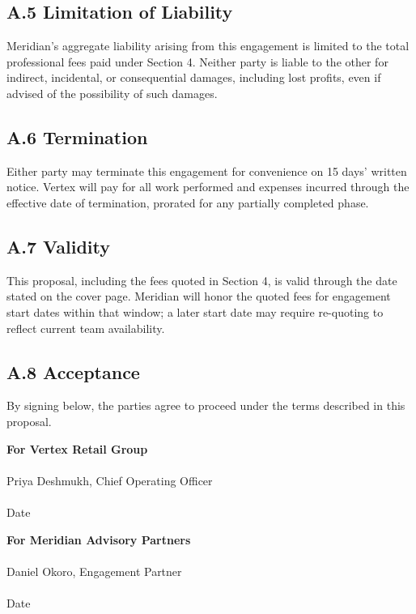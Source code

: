 \subsection*{A.5 Limitation of Liability}
Meridian's aggregate liability arising from this engagement is limited to the
total professional fees paid under Section 4. Neither party is liable to the
other for indirect, incidental, or consequential damages, including lost
profits, even if advised of the possibility of such damages.

\subsection*{A.6 Termination}
Either party may terminate this engagement for convenience on 15 days'
written notice. Vertex will pay for all work performed and expenses incurred
through the effective date of termination, prorated for any partially
completed phase.

\subsection*{A.7 Validity}
This proposal, including the fees quoted in Section 4, is valid through the
date stated on the cover page. Meridian will honor the quoted fees for
engagement start dates within that window; a later start date may require
re-quoting to reflect current team availability.

\vspace{1cm}

\subsection*{A.8 Acceptance}

\noindent
By signing below, the parties agree to proceed under the terms described in
this proposal.

\vspace{0.8cm}

\begin{minipage}[t]{0.46\textwidth}
  \textbf{For Vertex Retail Group}\\[1.2cm]
  \makebox[7cm]{\hrulefill}\\
  Priya Deshmukh, Chief Operating Officer\\[0.4cm]
  \makebox[7cm]{\hrulefill}\\
  Date
\end{minipage}%
\hfill
\begin{minipage}[t]{0.46\textwidth}
  \textbf{For Meridian Advisory Partners}\\[1.2cm]
  \makebox[7cm]{\hrulefill}\\
  Daniel Okoro, Engagement Partner\\[0.4cm]
  \makebox[7cm]{\hrulefill}\\
  Date
\end{minipage}
